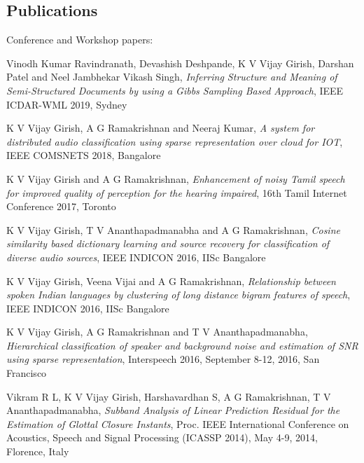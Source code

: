 \documentclass[line]{resume}
\begin{document}
{\begin{resume}
			\section{\mysidestyle Publications}
			\vspace{1.5mm}
			Conference  and Workshop papers:
			\begin{list2}
			\item Vinodh Kumar Ravindranath, Devashish Deshpande, K V Vijay Girish, Darshan Patel and Neel Jambhekar
Vikash Singh, \textit{ Inferring Structure and Meaning of Semi-Structured Documents by using a Gibbs Sampling Based Approach}, IEEE ICDAR-WML 2019, Sydney
					\item K V Vijay Girish, A G Ramakrishnan and Neeraj Kumar, \textit{A system for distributed audio classification using sparse representation over cloud for IOT}, IEEE COMSNETS 2018, Bangalore
			
			\item K V Vijay Girish and A G Ramakrishnan, \textit{Enhancement of noisy Tamil speech for improved quality of perception for the hearing impaired}, 16th Tamil Internet Conference 2017, Toronto
					
				\item  K V Vijay Girish, T V Ananthapadmanabha and A G Ramakrishnan,  \textit{Cosine similarity based dictionary learning and source recovery for classification of diverse audio sources}, IEEE INDICON 2016, IISc Bangalore
					
				
				\item  K V Vijay Girish, Veena Vijai and A G Ramakrishnan,  \textit{Relationship between spoken Indian languages by clustering of long distance bigram features of speech},  IEEE INDICON 2016, IISc Bangalore
				
				\item	K V Vijay Girish, A G Ramakrishnan and T V Ananthapadmanabha, \textit{Hierarchical classification of speaker and background noise and estimation of SNR using sparse representation}, Interspeech 2016, September 8-12, 2016, San Francisco
				
				
				
				\item Vikram R L, K V Vijay Girish, Harshavardhan S, A G Ramakrishnan, T V Ananthapadmanabha, 
				\textit{Subband Analysis of Linear Prediction Residual for the Estimation of Glottal Closure Instants}, Proc. IEEE International Conference on Acoustics, Speech and Signal Processing (ICASSP 2014), May 4-9, 2014, Florence, Italy
				

\end{list2}
\end{resume}}
\end{document}
